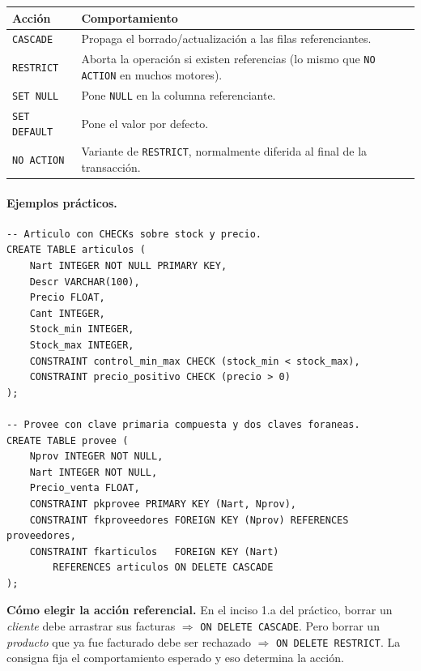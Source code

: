 \documentclass[11pt,a4paper]{article}
\begin{document}
\begin{center}
\begin{tabular}{@{}l p{10.5cm}@{}}
\toprule
\textbf{Acción} & \textbf{Comportamiento} \\
\midrule
\texttt{CASCADE}     & Propaga el borrado/actualización a las filas
                       referenciantes. \\
\texttt{RESTRICT}    & Aborta la operación si existen referencias
                       (lo mismo que \texttt{NO ACTION} en muchos motores). \\
\texttt{SET NULL}    & Pone \texttt{NULL} en la columna referenciante. \\
\texttt{SET DEFAULT} & Pone el valor por defecto. \\
\texttt{NO ACTION}   & Variante de \texttt{RESTRICT}, normalmente diferida
                       al final de la transacción. \\
\bottomrule
\end{tabular}
\end{center}

\paragraph{Ejemplos prácticos.}

\begin{lstlisting}
-- Articulo con CHECKs sobre stock y precio.
CREATE TABLE articulos (
    Nart INTEGER NOT NULL PRIMARY KEY,
    Descr VARCHAR(100),
    Precio FLOAT,
    Cant INTEGER,
    Stock_min INTEGER,
    Stock_max INTEGER,
    CONSTRAINT control_min_max CHECK (stock_min < stock_max),
    CONSTRAINT precio_positivo CHECK (precio > 0)
);

-- Provee con clave primaria compuesta y dos claves foraneas.
CREATE TABLE provee (
    Nprov INTEGER NOT NULL,
    Nart INTEGER NOT NULL,
    Precio_venta FLOAT,
    CONSTRAINT pkprovee PRIMARY KEY (Nart, Nprov),
    CONSTRAINT fkproveedores FOREIGN KEY (Nprov) REFERENCES proveedores,
    CONSTRAINT fkarticulos   FOREIGN KEY (Nart)
        REFERENCES articulos ON DELETE CASCADE
);
\end{lstlisting}

\begin{nota}
\textbf{Cómo elegir la acción referencial.} En el inciso 1.a del práctico,
borrar un \emph{cliente} debe arrastrar sus facturas $\Rightarrow$
\texttt{ON DELETE CASCADE}. Pero borrar un \emph{producto} que ya fue
facturado debe ser rechazado $\Rightarrow$ \texttt{ON DELETE RESTRICT}.
La consigna fija el comportamiento esperado y eso determina la acción.
\end{nota}
\end{document}
